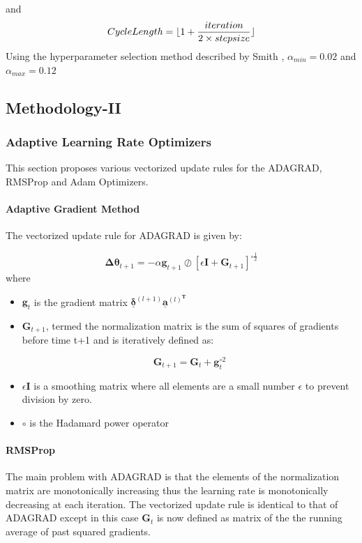 \documentclass{article}
\begin{document}
and \begin{equation}
Cycle \space Length = \lfloor{1 + \frac{iteration}{2\times{stepsize}}}\rfloor
\end{equation}
Using the hyperparameter selection method described by Smith \cite{smith2017cyclical}, $\alpha_{min} = 0.02$ and $\alpha_{max} = 0.12$
\subsection{Methodology-II}

\subsubsection{Adaptive Learning Rate Optimizers}
This section proposes various vectorized update rules for the ADAGRAD, RMSProp and Adam Optimizers. 
\paragraph{Adaptive Gradient Method}
The vectorized update rule for ADAGRAD is given by:

\begin{equation}
\boldsymbol{\Delta{\theta}}_{t+1} = -\alpha\boldsymbol{g}_{t+1}\oslash[\epsilon\boldsymbol{I} + \boldsymbol{G}_{t+1}]^{\circ\frac{1}{2}}
\end{equation} 
where 
\begin{itemize}
	\item $\boldsymbol{g}_t$ is the gradient matrix $\underline{\boldsymbol{\delta}}^{(l+1)}\underline{\boldsymbol{a}}^{(l)^{\boldsymbol{T}}}$
	
	\item $\boldsymbol{G}_{t+1}$, termed the normalization matrix is the sum of squares of gradients before time t+1 and is iteratively defined as:
	
	\begin{equation}
	\boldsymbol{G}_{t+1} = \boldsymbol{G}_{t} + \boldsymbol{g}_{t}^{\circ{2}}
	\end{equation} 
	
	\item $\epsilon\boldsymbol{I}$ is a smoothing matrix where all elements are a small number $\epsilon$ to prevent division by zero.
	
	\item $\circ$ is the Hadamard power operator
\end{itemize}



\paragraph{RMSProp}
The main problem with ADAGRAD is that the elements of the normalization matrix are monotonically increasing thus the learning rate is monotonically decreasing at each iteration.
The vectorized update rule is identical to that of ADAGRAD except in this case $\boldsymbol{G}_t$ is now defined as matrix of the the running average of past squared gradients.
\end{document}
